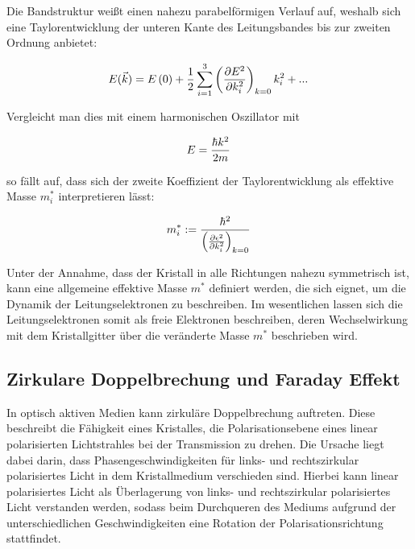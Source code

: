 Die Bandstruktur weißt einen nahezu parabelförmigen Verlauf auf, weshalb sich eine Taylorentwicklung der unteren Kante des
Leitungsbandes bis zur zweiten Ordnung anbietet:

\begin{equation}
    E(\vec{k})=E\left(0\right)+\frac{1}{2}\sum_{i=1}^3\left(\frac{\partial E^2}{\partial k_i^2}\right)_{k=0}k_i^2+...\,
    \notag
\end{equation}
 
Vergleicht man dies mit einem harmonischen Oszillator mit

\begin{equation}
    E=\frac{\hbar k^2}{2m}\,
    \notag
\end{equation}

so fällt auf, dass sich der zweite Koeffizient der Taylorentwicklung als effektive Masse $m_i^*$ interpretieren lässt:
    
\begin{equation}
    m_i^*:=\frac{\hbar^2}{\left(\frac{\partial\epsilon^2}{\partial k_i^2}\right)_{k=0}}\,
    \notag
\end{equation}

Unter der Annahme, dass der Kristall in alle Richtungen nahezu symmetrisch ist, kann eine allgemeine effektive Masse
$m^*$ definiert werden, die sich eignet, um die Dynamik der Leitungselektronen zu beschreiben. Im wesentlichen
lassen sich die Leitungselektronen somit als freie Elektronen beschreiben, deren Wechselwirkung mit dem Kristallgitter
über die veränderte Masse $m^*$ beschrieben wird.

\subsection{Zirkulare Doppelbrechung und Faraday Effekt}
\label{sec:Faraday}

In optisch aktiven Medien kann zirkuläre Doppelbrechung auftreten. Diese beschreibt die
Fähigkeit eines Kristalles, die Polarisationsebene eines linear polarisierten Lichtstrahles bei der Transmission zu drehen.
Die Ursache liegt dabei darin, dass Phasengeschwindigkeiten für links- und rechtszirkular polarisiertes Licht in dem Kristallmedium verschieden sind.
Hierbei kann linear polarisiertes Licht als Überlagerung von links- und rechtszirkular polarisiertes Licht verstanden werden, sodass
beim Durchqueren des Mediums aufgrund der unterschiedlichen Geschwindigkeiten eine Rotation der Polarisationsrichtung stattfindet. \cite{V46Anhang}

